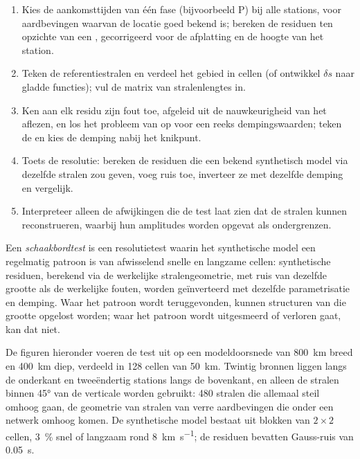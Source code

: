 \begin{method}[Looptijdtomografie]\label{met:b3:seismology-imaging:tomo}
\begin{enumerate}
  \item Kies de aankomsttijden van één fase (bijvoorbeeld P) bij alle stations, voor
        aardbevingen waarvan de locatie goed bekend is; bereken de residuen
        ten opzichte van een , gecorrigeerd voor de afplatting en
        de hoogte van het station.
  \item Teken de referentiestralen en verdeel het gebied in cellen (of ontwikkel
        $\delta s$ naar gladde functies); vul de matrix van stralenlengtes in.
  \item Ken aan elk residu zijn fout toe, afgeleid uit de nauwkeurigheid van het aflezen, en los
        het probleem van  op voor een reeks dempingswaarden; teken
        de  en kies de demping nabij het knikpunt.
  \item Toets de resolutie: bereken de residuen die een bekend synthetisch
        model via dezelfde stralen zou geven, voeg ruis toe, inverteer ze met dezelfde
        demping en vergelijk.
  \item Interpreteer alleen de afwijkingen die de test laat zien dat de stralen
        kunnen reconstrueren, waarbij hun amplitudes worden opgevat als ondergrenzen.
\end{enumerate}
\end{method}

\begin{definition}[Schaakbordtest]\label{def:b3:seismology-imaging:checkerboard}
Een \emph{schaakbordtest} is een resolutietest waarin
het synthetische model een regelmatig patroon is van afwisselend snelle en langzame
cellen: synthetische residuen, berekend via de werkelijke stralengeometrie, met ruis
van dezelfde grootte als de werkelijke fouten, worden geïnverteerd met dezelfde parametrisatie en
demping. Waar het patroon wordt teruggevonden, kunnen structuren van die grootte
opgelost worden; waar het patroon wordt uitgesmeerd of verloren gaat, kan dat niet.
\end{definition}

De figuren hieronder voeren de test uit op een modeldoorsnede van \qty{800}{km} breed en
\qty{400}{km} diep, verdeeld in 128 cellen van \qty{50}{km}. Twintig bronnen liggen
langs de onderkant en tweeëndertig stations langs de bovenkant, en alleen de stralen binnen
\ang{45} van de verticale worden gebruikt: 480 stralen die allemaal steil omhoog gaan,
de geometrie van stralen van verre aardbevingen die onder een netwerk omhoog komen. De
synthetische model bestaat uit blokken van $2\times2$ cellen, \qty{3}{\percent} snel of langzaam
rond \qty{8}{km.s^{-1}}; de residuen bevatten Gauss-ruis van
\qty{0.05}{s}.

